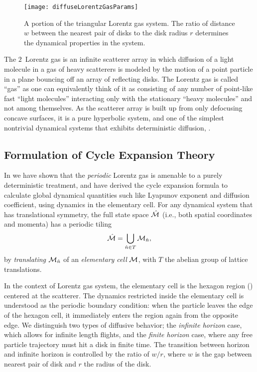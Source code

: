 \documentclass[aps,pre,showpacs,preprint,groupedaddress,floatfix]{revtex4-1}
\begin{document}
\begin{figure}[htbp]
\begin{center}

\texttt{[image: diffuseLorentzGasParams]}

\end{center}
\caption[]{\label{fig-schrieberFig1} A portion of the triangular Lorentz gas system. The ratio of distance $w$ between the nearest pair of disks to the disk radius $r$ determines the dynamical properties in the system.}

\end{figure}

The $2$\dmn\ Lorentz gas is an infinite scatterer array in which
diffusion of a light molecule in a gas of heavy scatterers is modeled by
the motion of a point particle in a plane bouncing off an array of
reflecting disks. The Lorentz gas is called ``gas'' as one can
equivalently think of it as consisting of any number of point-like fast
``light molecules'' interacting only with the stationary ``heavy
molecules'' and not among themselves.  As the scatterer array is built up
from only defocusing concave surfaces, it is a pure hyperbolic system,
and one of the simplest nontrivial dynamical systems that exhibits
deterministic diffusion, .

\subsection{Formulation of Cycle Expansion Theory}
In  we have shown that the {\em  periodic} Lorentz  gas is
amenable to a purely deterministic treatment, and have derived the cycle
expansion formula to calculate global dynamical quantities such like
Lyapunov exponent and diffusion coefficient, using dynamics in the
elementary cell. For any dynamical system that has translational
symmetry, the full state space $\hat {{\cal M}}$ (i.e., both spatial coordinates and
momenta) has a periodic tiling \[\hat {{\cal M}}=\bigcup_{ \hat n \in T} {\cal M}_{\hat n},\] by
{\em translating} ${\cal M}_{\hat n}$ of an {\em elementary cell} ${\cal M}$, with $T$
the abelian group of lattice translations.

In the context of Lorentz gas system, the elementary cell is the hexagon
region () centered at the scatterer. The
dynamics restricted inside the elementary cell is understood as the
periodic boundary condition: when the particle leaves the edge of the
hexagon cell, it immediately enters the region again from the opposite
edge. We distinguish two types of diffusive behavior; the {\em infinite
horizon} case, which allows for infinite length flights, and the {\em
finite horizon} case, where any free particle trajectory must hit a disk
in finite time. The transition between horizon and infinite horizon is
controlled by the ratio of $w/r$, where $w$ is the gap between nearest
pair of disk and $r$ the radius of the disk.
\end{document}
